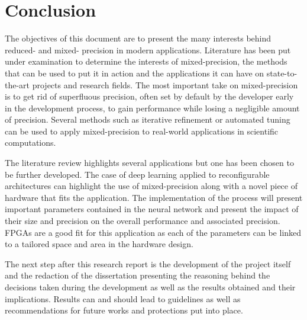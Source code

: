\chapter{Conclusion} %

\label{Chapter9} %


The objectives of this document are to present the many interests behind reduced- and mixed- precision in modern applications. Literature has been put under examination to determine the interests of mixed-precision, the methods that can be used to put it in action and the applications it can have on state-to-the-art projects and research fields. The most important take on mixed-precision is to get rid of superfluous precision, often set by default by the developer early in the development process, to gain performance while losing a negligible amount of precision. Several methods such as iterative refinement or automated tuning can be used to apply mixed-precision to real-world applications in scientific computations.

The literature review highlights several applications but one has been chosen to be further developed. The case of deep learning applied to reconfigurable architectures can highlight the use of mixed-precision along with a novel piece of hardware that fits the application. The implementation of the process will present important parameters contained in the neural network and present the impact of their size and precision on the overall performance and associated precision. FPGAs are a good fit for this application as each of the parameters can be linked to a tailored space and area in the hardware design.

The next step after this research report is the development of the project itself and the redaction of the dissertation presenting the reasoning behind the decisions taken during the development as well as the results obtained and their implications. Results can and should lead to guidelines as well as recommendations for future works and protections put into place.

